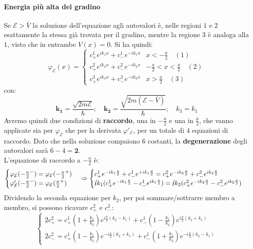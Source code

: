\documentclass[../../FisicaTeorica.tex]{subfiles}
\begin{document}
\paragraph{Energia più alta del gradino\\}
Se $\mathcal{E}>\bar{V}$ la soluzione dell'equazione agli autovalori è, nelle regioni $1$ e $2$ esattamente la stessa già trovata per il gradino, mentre la regione $3$ è analoga alla $1$, visto che in entrambe $V(x)=0$. Si ha quindi:
\begin{equation}
\varphi_\mathcal{E}(x)= \begin{cases}
c^1_+ e^{ik_1x} + c^1_-e^{-ik_1x} & x<-\frac{a}{2}\quad (1)\\
c^2_+ e^{ik_2x}+c^2_- e^{-ik_2x} & -\frac{a}{2}<x<\frac{a}{2}\quad (2)\\
c^3_+ e^{ik_3 x} + c^3_- e^{-ik_3 x} & x>\frac{a}{2}\quad(3)
\end{cases}
\label{eqn:autofunzioni_rettangolari}
\end{equation}
con:
\[
\bm{k_1}=\frac{\sqrt{2m\mathcal{E}}}{\hbar}; \quad \bm{k_2}=\frac{\sqrt{2m(\mathcal{E}-\bar{V})}}{\hbar}; \quad k_3 = k_1
\]
Avremo quindi due condizioni di \textbf{raccordo}, una in $-\frac{a}{2}$ e una in $\frac{a}{2}$, che vanno applicate sia per $\varphi_\mathcal{E}$ che per la derivata $\varphi'_\mathcal{E}$, per un totale di $4$ equazioni di raccordo. Dato che nella soluzione compaiono $6$ costanti, la \textbf{degenerazione} degli autovalori sarà $6-4=\bm{2}$.\\
L'equazione di raccordo a $-\frac{a}{2}$ è:
\[
\begin{cases}
\varphi_\mathcal{E}(-\frac{a}{2}^-)=\varphi_\mathcal{E}(-\frac{a}{2}^+)\\
\varphi'_\mathcal{E}(-\frac{a}{2}^-)=\varphi_\mathcal{E}(\frac{a}{2}^+)
\end{cases} \Rightarrow 
\begin{cases}
c^1_+ e^{-ik_1\frac{a}{2}}+c^1_- e^{+ik_1\frac{a}{2}}=c^2_+ e^{-ik_2\frac{a}{2}}+c^2_- e^{ik_2 \frac{a}{2}}\\
\cancel{i}k_1(c^1_+ e^{-ik_1\frac{a}{2}}-c^1_-e^{ik_1\frac{a}{2}})
=\cancel{i}k_2(c^2_+e^{-ik_2\frac{a}{2}}-c^2_-e^{ik_2\frac{a}{2}})
\end{cases}
\]
Dividendo la seconda equazione per $k_2$, per poi sommare/sottrarre membro a membro, si possono ricavare $c^2_+$ e $c^2_-$:
\begin{equation}
\begin{cases}
2c^2_+ = c^1_+\left(1+\frac{k_1}{k_2}\right) e^{i\frac{a}{2}(k_2-k_1)}+c^1_- \left(1-\frac{k_1}{k_2}\right) e^{i\frac{a}{2}(k_2+k_1)}\\
2c^2_- = c^1_+\left(1-\frac{k_1}{k_2}\right)e^{-i\frac{a}{2}(k_2+k_1)} + c^1_- \left(1+\frac{k_1}{k_2}\right) e^{-i\frac{a}{2}(k_2-k_1)}
\end{cases}
\label{eqn:raccordo1}
\end{equation}
\end{document}
